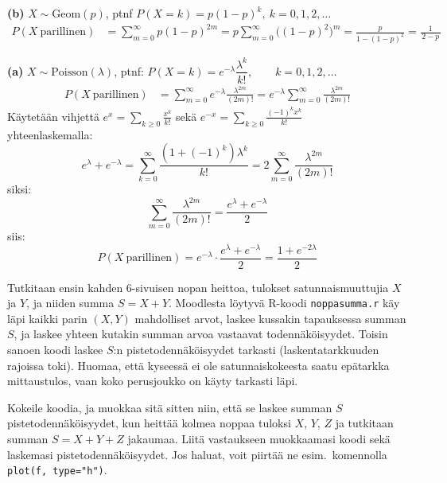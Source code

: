 \documentclass[12pt,a4paper]{article}
\begin{document}
\begin{kohta}
\item[\textbf{(b)}] \textbf{$X\sim\mathrm{Geom}(p)$}, ptnf $P(X=k)=p(1-p)^k,\ k=0,1,2,\dots$
\[
\begin{aligned}
P(X\ \text{parillinen})
&=\sum_{m=0}^\infty p(1-p)^{2m}
= p\sum_{m=0}^\infty \big((1-p)^2\big)^m
= \frac{p}{1-(1-p)^2}
= \frac{1}{\,2-p\,}
\end{aligned}
\]

\item[\textbf{(a)}] \textbf{$X\sim\mathrm{Poisson}(\lambda)$}, ptnf: $P(X=k)=e^{-\lambda}\dfrac{\lambda^k}{k!} ,\qquad k=0,1,2,\dots$
\[
\begin{aligned}
P(X\ \text{parillinen})
&=\sum_{m=0}^\infty e^{-\lambda}\frac{\lambda^{2m}}{(2m)!}
= e^{-\lambda}\sum_{m=0}^\infty\frac{\lambda^{2m}}{(2m)!}
\end{aligned}
\]
Käytetään vihjettä $e^x=\sum_{k\ge0}\frac{x^k}{k!}$ sekä $e^{-x}=\sum_{k\ge0}\frac{(-1)^k x^k}{k!}$\\
yhteenlaskemalla:
\[
e^{\lambda}+e^{-\lambda}
=\sum_{k=0}^\infty \frac{(1+(-1)^k)\lambda^k}{k!}
=2\sum_{m=0}^\infty \frac{\lambda^{2m}}{(2m)!}
\]
siksi:
\[
\sum_{m=0}^\infty \frac{\lambda^{2m}}{(2m)!}
=\frac{e^{\lambda}+e^{-\lambda}}{2}
\]
siis:
\[
P(X\ \text{parillinen})
= e^{-\lambda}\cdot\frac{e^{\lambda}+e^{-\lambda}}{2}
= \frac{1+e^{-2\lambda}}{2}
\]
\end{kohta}






\pagebreak
{}
Tutkitaan ensin kahden 6-sivuisen nopan heittoa, tulokset
satunnaismuuttujia $X$ ja $Y$, ja niiden summa $S=X+Y$. Moodlesta löytyvä
R-koodi \texttt{noppasumma.r} käy läpi kaikki parin $(X,Y)$ mahdolliset
arvot, laskee kussakin tapauksessa summan $S$, ja laskee yhteen kutakin
summan arvoa vastaavat todennäköisyydet. Toisin sanoen koodi laskee $S$:n
pistetodennäköisyydet tarkasti (laskentatarkkuuden rajoissa toki). Huomaa,
että kyseessä ei ole satunnaiskokeesta saatu epätarkka mittaustulos, vaan 
koko perusjoukko on käyty tarkasti läpi.

Kokeile koodia, ja muokkaa sitä sitten niin, että se laskee summan $S$
pistetodennäköisyydet, kun heittää kolmea noppaa tuloksi $X$, $Y$, $Z$
ja tutkitaan summan $S=X+Y+Z$ jakaumaa. Liitä vastaukseen muokkaamasi 
koodi sekä laskemasi pistetodennäköisyydet. Jos haluat, voit piirtää
ne esim.\ komennolla \texttt{plot(f, type="h")}.\\
\end{document}
